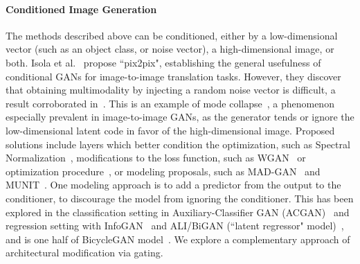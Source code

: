 \paragraph{Conditioned Image Generation} The methods described above can be conditioned, either by a low-dimensional vector (such as an object class, or noise vector), a high-dimensional image, or both. Isola et al.~\cite{isola2016image2image} propose ``pix2pix", establishing the general usefulness of conditional GANs for image-to-image translation tasks. However, they discover that obtaining multimodality by injecting a random noise vector is difficult, a result corroborated in~\cite{mathieu2015deep,pathak2016context,zhu2017toward}.
This is an example of mode collapse~\cite{goodfellow2016nips}, a phenomenon especially prevalent in image-to-image GANs, as the generator tends or ignore the low-dimensional latent code in favor of the high-dimensional image.
Proposed solutions include layers which better condition the optimization, such as Spectral Normalization~\cite{zhang2018self,miyato2018spectral}, modifications to the loss function, such as WGAN~\cite{arjovsky2017wasserstein,gulrajani2017improved} or optimization procedure~\cite{heusel2017gans}, or modeling proposals, such as MAD-GAN~\cite{ghosh2017multi} and MUNIT~\cite{huang2018multimodal}. 
One modeling approach is to add a predictor from the output to the conditioner, to discourage the model from ignoring the conditioner. This has been explored in the classification setting in Auxiliary-Classifier GAN (ACGAN)~\cite{odena2016conditional} and regression setting with InfoGAN~\cite{chen2016infogan} and ALI/BiGAN (``latent regressor" model)~\cite{dumoulin2016adversarially,donahue2016adversarial}, and is one half of BicycleGAN model~\cite{zhu2017toward}. We explore a complementary approach of architectural modification via gating.


